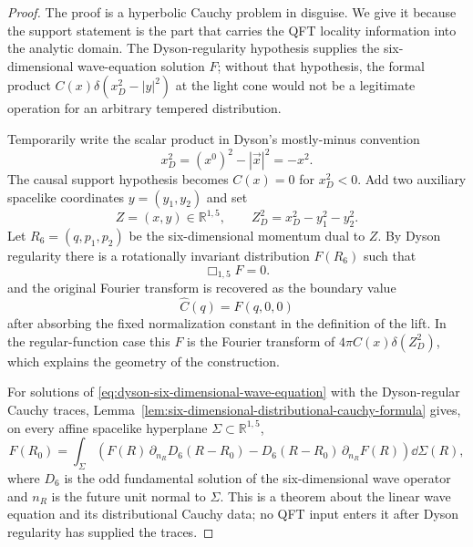 \begin{proof}
The proof is a hyperbolic Cauchy problem in disguise.  We give it because the
support statement is the part that carries the QFT locality information into
the analytic domain.  The Dyson-regularity hypothesis supplies the
six-dimensional wave-equation solution \(F\); without that hypothesis, the
formal product \(C(x)\delta(x_D^2-|y|^2)\) at the light cone would not be a
legitimate operation for an arbitrary tempered distribution.

Temporarily write the scalar product in Dyson's mostly-minus convention
\[
  x_D^2=(x^0)^2-|\vec x|^2=-x^2 .
\]
The causal support hypothesis becomes \(C(x)=0\) for \(x_D^2<0\).  Add two
auxiliary spacelike coordinates \(y=(y_1,y_2)\) and set
\[
  Z=(x,y)\in\mathbb R^{1,5},
  \qquad
  Z_D^2=x_D^2-y_1^2-y_2^2 .
\]
Let \(R_6=(q,p_1,p_2)\) be the six-dimensional momentum dual to \(Z\).  By
Dyson regularity there is a rotationally invariant distribution \(F(R_6)\)
such that
\begin{equation}
  \Box_{1,5}F=0 .
  \label{eq:dyson-six-dimensional-wave-equation}
\end{equation}
and the original Fourier transform is recovered as the boundary value
\[
  \widehat C(q)=F(q,0,0)
\]
after absorbing the fixed normalization constant in the definition of the
lift.  In the regular-function case this \(F\) is the Fourier transform of
\(4\pi C(x)\delta(Z_D^2)\), which explains the geometry of the construction.

For solutions of \eqref{eq:dyson-six-dimensional-wave-equation} with the
Dyson-regular Cauchy traces,
Lemma~\ref{lem:six-dimensional-distributional-cauchy-formula} gives,
on every affine spacelike hyperplane
\(\Sigma\subset\mathbb R^{1,5}\),
\begin{equation}
  F(R_0)
  =
  \int_\Sigma
  \left(
    F(R)\,\partial_{n_R}D_6(R-R_0)
    -
    D_6(R-R_0)\,\partial_{n_R}F(R)
  \right)\dd\Sigma(R),
  \label{eq:dyson-cauchy-wave-formula}
\end{equation}
where \(D_6\) is the odd fundamental solution of the six-dimensional wave
operator and \(n_R\) is the future unit normal to \(\Sigma\).  This is a
theorem about the linear wave equation and its distributional Cauchy data; no
QFT input enters it after Dyson regularity has supplied the traces.


\end{proof}
